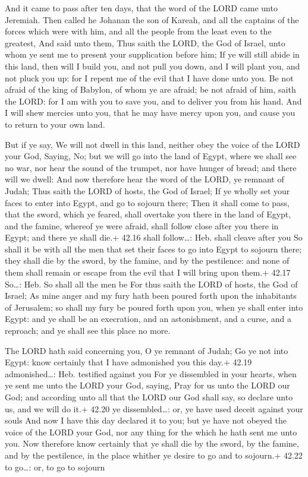  And it came to pass after ten days, that the word of the
LORD came unto Jeremiah.  Then called he Johanan the son of
Kareah, and all the captains of the forces which were with him, and all
the people from the least even to the greatest,  And said
unto them, Thus saith the LORD, the God of Israel, unto whom ye sent me
to present your supplication before him;  If ye will still
abide in this land, then will I build you, and not pull you down, and I
will plant you, and not pluck you up: for I repent me of the evil that I
have done unto you.  Be not afraid of the king of Babylon,
of whom ye are afraid; be not afraid of him, saith the LORD: for I am
with you to save you, and to deliver you from his hand. 
And I will shew mercies unto you, that he may have mercy upon you, and
cause you to return to your own land.

 But if ye say, We will not dwell in this land, neither
obey the voice of the LORD your God,  Saying, No; but we
will go into the land of Egypt, where we shall see no war, nor hear the
sound of the trumpet, nor have hunger of bread; and there will we dwell:
 And now therefore hear the word of the LORD, ye remnant of
Judah; Thus saith the LORD of hosts, the God of Israel; If ye wholly set
your faces to enter into Egypt, and go to sojourn there; 
Then it shall come to pass, that the sword, which ye feared, shall
overtake you there in the land of Egypt, and the famine, whereof ye were
afraid, shall follow close after you there in Egypt; and there ye shall
die.+ 42.16 shall follow\ldots: Heb. shall cleave after you
 So shall it be with all the men that set their faces to go
into Egypt to sojourn there; they shall die by the sword, by the famine,
and by the pestilence: and none of them shall remain or escape from the
evil that I will bring upon them.+ 42.17 So\ldots: Heb. So shall all the
men be  For thus saith the LORD of hosts, the God of
Israel; As mine anger and my fury hath been poured forth upon the
inhabitants of Jerusalem; so shall my fury be poured forth upon you,
when ye shall enter into Egypt: and ye shall be an execration, and an
astonishment, and a curse, and a reproach; and ye shall see this place
no more.

 The LORD hath said concerning you, O ye remnant of
Judah; Go ye not into Egypt: know certainly that I have admonished you
this day.+ 42.19 admonished\ldots: Heb. testified against you
 For ye dissembled in your hearts, when ye sent me unto the
LORD your God, saying, Pray for us unto the LORD our God; and according
unto all that the LORD our God shall say, so declare unto us, and we
will do it.+ 42.20 ye dissembled\ldots: or, ye have used deceit against
your souls  And now I have this day declared it to you; but
ye have not obeyed the voice of the LORD your God, nor any thing for the
which he hath sent me unto you.  Now therefore know
certainly that ye shall die by the sword, by the famine, and by the
pestilence, in the place whither ye desire to go and to sojourn.+ 42.22
to go\ldots: or, to go to sojourn

